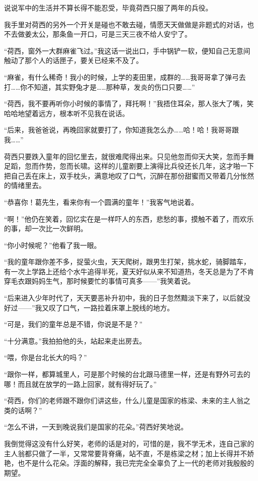 \par 说说军中的生活并不算长得不能忍受，毕竟荷西只服了两年的兵役。
\par 我手里对荷西的另外一个开关是碰也不敢去碰，情愿天天做做是非题式的对话，也不去做姜太公，那条鱼一开口，可是三天三夜不给人安宁了。
\par “荷西，窗外一大群麻雀飞过。”我这话一说出口，手中锅铲一软，便知自己无意间触动了那个人的话匣子，要关已经来不及了。
\par “麻雀，有什么稀奇！我小的时候，上学的麦田里，成群的……我哥哥拿了弹弓去打……你不知道，其实野兔才是……那种草，发炎的伤口只要……”
\par “荷西，我不要再听你小时候的事情了，拜托啊！”我捂住耳朵，那人张大了嘴，笑哈哈地望着远方，根本听不见我在说话。
\par “后来，我爸爸说，再晚回家就要打了，你知道我怎么办……哈！哈！我哥哥跟我……”
\par 荷西只要跌入童年的回忆里去，就很难爬得出来。只见他忽而仰天大笑，忽而手舞足蹈，忽而作势，忽而长啸。这样的儿童剧要上演得比兵役还长几年，这才啪一下把自己丢在床上，双手枕头，满意地叹了口气，沉醉在那份甜蜜而又带着几分怅然的情绪里去。
\par “恭喜你！葛先生，看来你有一个圆满的童年！”我客气地说着。
\par “啊！”他仍在笑着，回忆实在是一样吓人的东西，悲愁的事，摸触不着了，而欢乐的事，却一次比一次鲜明。
\par “你小时候呢？”他看了我一眼。
\par “我的童年跟你差不多，捉萤火虫，天天爬树，跟男生打架，挑水蛇，骑脚踏车，有一次上学路上还给个水牛追得半死，夏天好似从来不知道热，冬天总是为了不肯穿毛衣跟妈妈生气，那时候要忙的事情可真多——”我笑着说。
\par “后来进入少年时代了，天天要恶补升初中，我的日子忽然黯淡下来了，以后就没好过——”我又叹了口气，一路拉着床罩上脱线的地方。
\par “可是，我们的童年总是不错，你说是不是？”
\par “十分满意。”我拍拍他的头，站起来走出房去。
\par “喂，你是台北长大的吗？”
\par “跟你一样，都算城里人，可是那个时候的台北跟马德里一样，还是有野外可去的哪！而且就在放学的一路上回家，就有得好玩了。”
\par “荷西，你们的老师跟不跟你们讲这些，什么儿童是国家的栋梁、未来的主人翁之类的话啊？”
\par “怎么不讲，一天到晚说我们是国家的花朵。”荷西好笑地说。
\par 我倒觉得这没有什么好笑，老师的话是对的，可惜的是，我不学无术，连自己家的主人翁都只做了一半，又常常要背脊痛，站不直，不是栋梁之材；加上长得并不娇艳，也不是什么花朵。浮面的解释，我已完完全全辜负了上一代的老师对我殷殷的期望。
